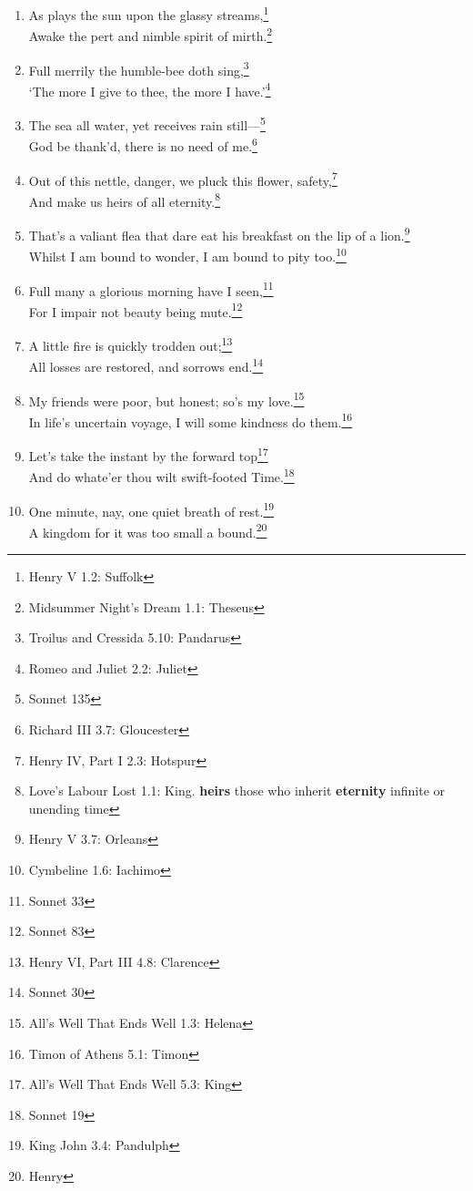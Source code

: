 \documentclass[17pt,twoside]{extarticle}
\begin{document}
\begin{enumerate}
{    Andronicus 2.1: Aaron}
\item
  As plays the sun upon the glassy streams,\footnote{Henry V 1.2:
    Suffolk}\\Awake the pert and nimble spirit of mirth.\footnote{Midsummer
    Night's Dream 1.1: Theseus}
\item
  Full merrily the humble-bee doth sing,\footnote{Troilus and Cressida
    5.10: Pandarus}\\`The more I give to thee, the more I
  have.'\footnote{Romeo and Juliet 2.2: Juliet}
\item
  The sea all water, yet receives rain still---\footnote{Sonnet 135}\\God
  be thank'd, there is no need of me.\footnote{Richard III 3.7:
    Gloucester}
\item
  Out of this nettle, danger, we pluck this flower, safety,\footnote{Henry
    IV, Part I 2.3: Hotspur}\\And make us heirs of all
  eternity.\footnote{Love's Labour Lost 1.1: King. \textbf{heirs} those
    who inherit \textbf{eternity} infinite or unending time}
\item
  That's a valiant flea that dare eat his breakfast on the lip of a
  lion.\footnote{Henry V 3.7: Orleans}\\Whilst I am bound to wonder, I
  am bound to pity too.\footnote{Cymbeline 1.6: Iachimo}
\item
  Full many a glorious morning have I seen,\footnote{Sonnet 33}\\For I
  impair not beauty being mute.\footnote{Sonnet 83}
\item
  A little fire is quickly trodden out;\footnote{Henry VI, Part III 4.8:
    Clarence}\\All losses are restored, and sorrows end.\footnote{Sonnet
    30}
\item
  My friends were poor, but honest; so's my love.\footnote{All's Well
    That Ends Well 1.3: Helena}\\In life's uncertain voyage, I will some
  kindness do them.\footnote{Timon of Athens 5.1: Timon}
\item
  Let's take the instant by the forward top\footnote{All's Well That
    Ends Well 5.3: King}\\And do whate'er thou wilt swift-footed
  Time.\footnote{Sonnet 19}
\item
  One minute, nay, one quiet breath of rest.\footnote{King John 3.4:
    Pandulph}\\A kingdom for it was too small a bound.\footnote{Henry
}
\end{enumerate}
\end{document}

